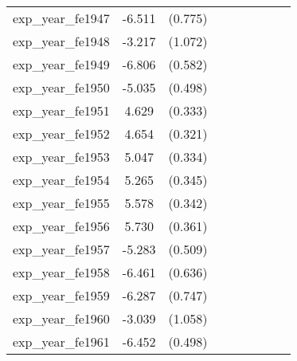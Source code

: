 {\begin{tabular}{l*{4}{cc}}
exp\_year\_fe1947&   -6.511\sym{***}&  (0.775)&                  &         &                  &         &                  &         \\
exp\_year\_fe1948&   -3.217\sym{**} &  (1.072)&                  &         &                  &         &                  &         \\
exp\_year\_fe1949&   -6.806\sym{***}&  (0.582)&                  &         &                  &         &                  &         \\
exp\_year\_fe1950&   -5.035\sym{***}&  (0.498)&                  &         &                  &         &                  &         \\
exp\_year\_fe1951&    4.629\sym{***}&  (0.333)&                  &         &                  &         &                  &         \\
exp\_year\_fe1952&    4.654\sym{***}&  (0.321)&                  &         &                  &         &                  &         \\
exp\_year\_fe1953&    5.047\sym{***}&  (0.334)&                  &         &                  &         &                  &         \\
exp\_year\_fe1954&    5.265\sym{***}&  (0.345)&                  &         &                  &         &                  &         \\
exp\_year\_fe1955&    5.578\sym{***}&  (0.342)&                  &         &                  &         &                  &         \\
exp\_year\_fe1956&    5.730\sym{***}&  (0.361)&                  &         &                  &         &                  &         \\
exp\_year\_fe1957&   -5.283\sym{***}&  (0.509)&                  &         &                  &         &                  &         \\
exp\_year\_fe1958&   -6.461\sym{***}&  (0.636)&                  &         &                  &         &                  &         \\
exp\_year\_fe1959&   -6.287\sym{***}&  (0.747)&                  &         &                  &         &                  &         \\
exp\_year\_fe1960&   -3.039\sym{**} &  (1.058)&                  &         &                  &         &                  &         \\
exp\_year\_fe1961&   -6.452\sym{***}&  (0.498)&                  &         &                  &         &                  &         \\

\end{tabular}}
